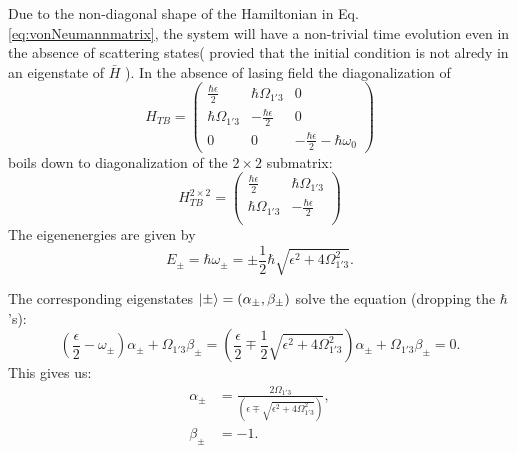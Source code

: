 \documentclass[10pt,letterpaper]{article}
\begin{document}
	Due to the non-diagonal shape of the Hamiltonian in Eq. \ref{eq:vonNeumannmatrix}, the system will have a non-trivial time evolution even in the absence of scattering states( provied that the initial condition is not alredy in an eigenstate of $\bar H$ ).  In the absence of lasing field the diagonalization of
	$$
	H_{TB} = \begin{pmatrix} 
	\frac{\hbar \epsilon}{2} & \hbar\Omega_{1'3} & 0 \\
	\hbar\Omega_{1'3}  & -\frac{\hbar	\epsilon}{2} &  0 \\
	0  & 0 & -\frac{\hbar \epsilon}{2}-\hbar\omega_{0}   
	\end{pmatrix} 
	$$ 
	boils down to diagonalization of the $2\times2$ submatrix:
	$$
	H_{TB}^{2\times2} = \begin{pmatrix} 
	\frac{\hbar \epsilon}{2} & \hbar\Omega_{1'3} \\
	\hbar\Omega_{1'3}  & -\frac{\hbar	\epsilon}{2} \\
	\end{pmatrix} 
	$$
	The eigenenergies are given by 
	$$
	E_{\pm} = \hbar \omega_\pm = \pm \frac{1}{2} \hbar \sqrt{\epsilon^2+4\Omega_{1'3}^2}.
	$$
	
	The corresponding eigenstates $\Ket{\pm} = (\alpha_{\pm},\beta_{\pm})$ solve the equation (dropping the $\hbar$'s):
	$$
	(\frac{\epsilon}{2}-\omega_\pm)\alpha_\pm + \Omega_{1'3}\beta_\pm = (\frac{\epsilon}{2}\mp \frac{1}{2}\sqrt{\epsilon^2+4\Omega_{1'3}^2})\alpha_\pm + \Omega_{1'3}\beta_\pm =0.
	$$
	This gives us:
	\begin{align}
	\alpha_{\pm} &= \frac{2\Omega_{1'3}}{(\epsilon\mp \sqrt{\epsilon^2+4\Omega_{1'3}^2})}, \\
	\beta_{\pm} &= -1.
	\end{align}
	
\end{document}
